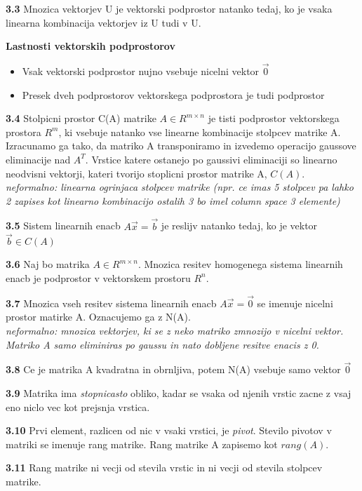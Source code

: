 \documentclass{article}
\begin{document}
\begin{multicols}{2}
	\textbf{3.3} Mnozica vektorjev U je vektorski podprostor natanko tedaj, ko je vsaka linearna
	kombinacija vektorjev iz U tudi v U.

	\textbf{Lastnosti vektorskih podprostorov}
	\begin{itemize}
		\item Vsak vektorski podprostor nujno vsebuje nicelni vektor $\vec{0}$
		\item Presek dveh podprostorov vektorskega podprostora je tudi podprostor
	\end{itemize}

	\textbf{3.4} Stolpicni prostor C(A) matrike $A \in R^{m \times n}$ je tisti podprostor
	vektorskega prostora $R^{m}$, ki vsebuje natanko vse linearne kombinacije stolpcev matrike A.\\
	Izracunamo ga tako, da matriko A transponiramo in izvedemo operacijo gaussove eliminacije nad $A^{T}$. Vrstice katere ostanejo po gaussivi eliminaciji
	so linearno neodvisni vektorji, kateri tvorijo stoplicni prostor matrike A, $C(A)$.
	\textit{neformalno: linearna ogrinjaca stolpcev matrike (npr. ce imas 5 stolpcev pa lahko 2 zapises kot linearno kombinacijo ostalih 3 bo imel column space 3 elemente)}

	\textbf{3.5} Sistem linearnih enacb $A\vec{x} = \vec{b}$ je reslijv natanko tedaj, ko je vektor
	$\vec{b} \in C(A)$

	\textbf{3.6} Naj bo matrika $A \in R^{m \times n}$. Mnozica resitev homogenega sistema linearnih
	enacb je podprostor v vektorskem prostoru $R^{n}$.

	\textbf{3.7} Mnozica vseh resitev sistema linearnih enacb $A\vec{x} = \vec{0}$ se imenuje nicelni
	prostor matirke A. Oznacujemo ga z N(A).\\
	\textit{neformalno: mnozica vektorjev, ki se z neko matriko zmnozijo v nicelni vektor. Matriko A samo eliminiras po gaussu in nato dobljene resitve enacis z 0.}

	\textbf{3.8} Ce je matrika A kvadratna in obrnljiva, potem N(A) vsebuje samo vektor $\vec{0}$

	\textbf{3.9} Matrika ima \textit{stopnicasto} obliko, kadar se vsaka od njenih vrstic zacne z vsaj eno
	niclo vec kot prejsnja vrstica.

	\textbf{3.10} Prvi element, razlicen od nic v vsaki vrstici, je \textit{pivot}. Stevilo pivotov v matriki
	se imenuje rang matrike. Rang matrike A zapisemo kot $rang(A)$.

	\textbf{3.11} Rang matrike ni vecji od stevila vrstic in ni vecji od stevila stolpcev matrike.


\end{multicols}
\end{document}
